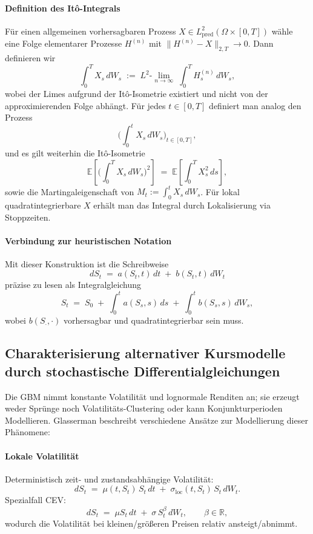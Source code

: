 \paragraph{Definition des It\^o-Integrals}
Für einen allgemeinen vorhersagbaren Prozess $X\in L^2_{\mathrm{pred}}(\Omega\times[0,T])$ wähle eine Folge elementarer Prozesse $H^{(n)}$ mit
$\|H^{(n)}-X\|_{2,T}\to 0$. Dann definieren wir
$$
\int_0^T X_s\,dW_s \;:=\; L^2\text{-}\lim_{n\to\infty}\;\int_0^T H^{(n)}_s\,dW_s,
$$
wobei der Limes aufgrund der It\^o-Isometrie existiert und nicht von der approximierenden Folge abhängt. Für jedes $t\in[0,T]$ definiert man analog den Prozess
$$
\Big(\int_0^t X_s\,dW_s\Big)_{t\in[0,T]},
$$
und es gilt weiterhin die It\^o-Isometrie
$$
\mathbb E\!\left[\Big(\int_0^T X_s\,dW_s\Big)^{\!2}\right] \;=\; \mathbb E\!\left[\int_0^T X_s^{2}\,ds\right],
$$
sowie die Martingaleigenschaft von $M_t:=\int_0^t X_s\,dW_s$. Für lokal quadratintegrierbare $X$ erhält man das Integral durch Lokalisierung via Stoppzeiten.

\paragraph{Verbindung zur heuristischen Notation}
Mit dieser Konstruktion ist die Schreibweise
$$
dS_t \;=\; a(S_t,t)\,dt \;+\; b(S_t,t)\,dW_t
$$
präzise zu lesen als Integralgleichung
$$
S_t \;=\; S_0 \;+\; \int_0^t a(S_s,s)\,ds \;+\; \int_0^t b(S_s,s)\,dW_s,
$$
wobei $b(S_\cdot,\cdot)$ vorhersagbar und quadratintegrierbar sein muss.


\subsection{Charakterisierung alternativer Kursmodelle durch stochastische Differentialgleichungen}

Die GBM nimmt konstante Volatilität und lognormale Renditen an; sie erzeugt weder Sprünge noch Volatilitäts-Clustering oder kann Konjunkturperioden Modellieren.
Glasserman \cite{glasserman2003monte} beschreibt verschiedene Ansätze zur Modellierung dieser Phänomene:

\paragraph{Lokale Volatilität}
Deterministisch zeit- und zustandsabhängige Volatilität:
$$
dS_t \;=\; \mu(t,S_t)\,S_t\,dt \;+\; \sigma_{\mathrm{loc}}(t,S_t)\,S_t\,dW_t.
$$
Spezialfall CEV:
$$
dS_t \;=\; \mu S_t\,dt \;+\; \sigma\,S_t^{\beta}\,dW_t,\qquad \beta\in\mathbb R,
$$
wodurch die Volatilität bei kleinen/größeren Preisen relativ ansteigt/abnimmt.

